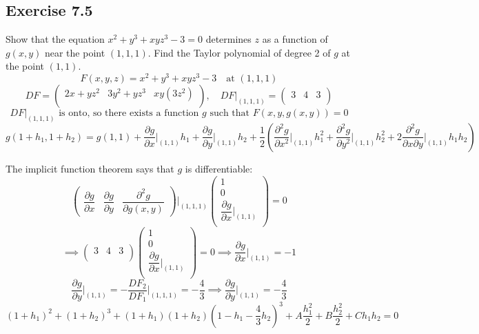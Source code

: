 \documentclass[11pt]{article}
\begin{document}
\subsection*{Exercise 7.5}
Show that the equation $x^2 + y^3 + xyz^3 - 3 = 0$ determines $z$ as a function of $g(x, y)$ near the point $(1, 1, 1)$. Find the Taylor polynomial of degree 2 of $g$ at the point $(1, 1)$.
\[
F(x,y,z) = x^2 + y^3 + xyz^3 - 3 \quad \text{at } (1,1,1)
\]
\[
DF = \begin{pmatrix}
    2x + yz^2 & 3y^2 + yz^3 & xy(3z^2) \\
\end{pmatrix}, \quad DF\big|_{(1,1,1)} = \begin{pmatrix}
    3 & 4 & 3 \\
    \end{pmatrix}
\]
\[
DF\big|_{(1,1,1)} \text{ is onto, so there exists a function } g \text{ such that } F(x,y,g(x,y)) = 0
\]
\[
g(1 + h_1, 1 + h_2) = g(1,1) + \frac{\partial g}{\partial x}\big|_{(1,1)}h_1 + \frac{\partial g}{\partial y}\big|_{(1,1)}h_2 + \frac{1}{2} \left(\frac{\partial^2 g}{\partial x^2}\big|_{(1,1)}h_1^2 + \frac{\partial^2 g}{\partial y^2}\big|_{(1,1)}h_2^2 + 2\frac{\partial^2 g}{\partial x \partial y}\big|_{(1,1)}h_1 h_2\right)
\]

The implicit function theorem says that $g$ is differentiable:
\[
\begin{pmatrix}
    \dfrac{\partial g}{\partial x} &
    \dfrac{\partial g}{\partial y} &
    \dfrac{\partial^2 g}{\partial g(x,y)}
\end{pmatrix} \big|_{(1,1,1)} \begin{pmatrix}
    1 \\
    0 \\
    \dfrac{\partial g}{\partial x}\big|_{(1,1)} \\
\end{pmatrix} = 0
\]
\[
\implies \begin{pmatrix}
    3 & 4 & 3 \\
    \end{pmatrix} \begin{pmatrix}
    1 \\
    0 \\
    \dfrac{\partial g}{\partial x}\big|_{(1,1)} \\
\end{pmatrix} = 0 \implies \dfrac{\partial g}{\partial x}\big|_{(1,1)} = -1
\]
\[
\frac{\partial g}{\partial y}\big|_{(1,1)} = -\frac{DF_2}{DF_1} \big|_{(1,1,1)} = -\frac{4}{3} \implies \dfrac{\partial g}{\partial y}\big|_{(1,1)} = -\frac{4}{3}
\]
\[
(1 + h_1)^2 + (1 + h_2)^3 + (1 + h_1)(1 + h_2)(1 - h_1 - \frac{4}{3}h_2)^3 + A \frac{h_1^2}{2} + B \frac{h_2^2}{2} + C h_1 h_2 = 0
\]
\end{document}
